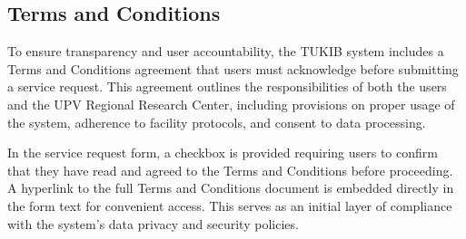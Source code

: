 



\subsection{Terms and Conditions}

To ensure transparency and user accountability, the TUKIB system includes a Terms and Conditions agreement that users must acknowledge before submitting a service request. This agreement outlines the responsibilities of both the users and the UPV Regional Research Center, including provisions on proper usage of the system, adherence to facility protocols, and consent to data processing.

In the service request form, a checkbox is provided requiring users to confirm that they have read and agreed to the Terms and Conditions before proceeding. A hyperlink to the full Terms and Conditions document is embedded directly in the form text for convenient access. This serves as an initial layer of compliance with the system’s data privacy and security policies.

